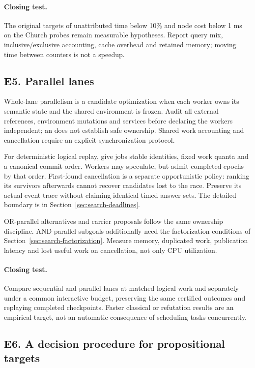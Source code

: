 \paragraph{Closing test.} The original targets of unattributed time below
10\% and node cost below 1 ms on the Church probes remain measurable
hypotheses. Report query mix, inclusive/exclusive accounting, cache overhead
and retained memory; moving time between counters is not a speedup.

\subsection{E5. Parallel lanes}

Whole-lane parallelism is a candidate optimization when each worker owns its
semantic state and the shared environment is frozen. Audit all external
references, environment mutations and services before declaring the workers
independent; an  does not establish safe ownership. Shared work
accounting and cancellation require an explicit synchronization protocol.

For deterministic logical replay, give jobs stable identities, fixed work
quanta and a canonical commit order. Workers may speculate, but admit completed
epochs by that order. First-found cancellation is a separate opportunistic
policy: ranking its survivors afterwards cannot recover candidates lost to
the race. Preserve its actual event trace without claiming identical timed
answer sets. The detailed boundary is in Section~\ref{sec:search-deadlines}.

OR-parallel alternatives and carrier proposals follow the same ownership
discipline. AND-parallel subgoals additionally need the factorization
conditions of Section~\ref{sec:search-factorization}. Measure memory, duplicated
work, publication latency and lost useful work on cancellation, not only CPU
utilization.

\paragraph{Closing test.} Compare sequential and parallel lanes at matched
logical work and separately under a common interactive budget, preserving the
same certified outcomes and replaying completed checkpoints. Faster classical
or refutation results are an empirical target, not an automatic consequence
of scheduling tasks concurrently.

\subsection{E6. A decision procedure for propositional targets}

